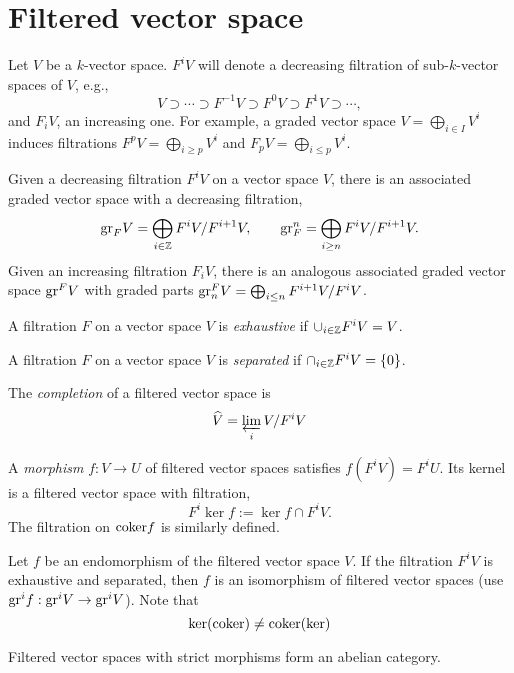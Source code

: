 \section{Filtered vector space}
Let $V$ be a $k$-vector space. $F^iV$ will denote a decreasing filtration of sub-$k$-vector spaces of $V$, e.g.,
\[
V \supset \cdots \supset F^{-1}V \supset F^0V \supset F^1V \supset \cdots,
\]
and $F_iV$, an increasing one. For example, a graded vector space $V = \bigoplus_{i \in I} V^i$ induces filtrations $F^pV = \bigoplus_{i \geq p} V^i$ and $F_p V = \bigoplus_{i \leq p} V^i$.
\begin{defn}\label{def:assocgraded}
Given a decreasing filtration $F^iV$ on a vector space $V$, there is an associated graded vector space with a decreasing filtration,
\[
\mathrm{gr}_F V = \bigoplus_{i \in \mathbb{Z}} F^i V / F^{i+1}V, \qquad \mathrm{gr}_F^n = \bigoplus_{i \geq n} F^i V / F^{i+1}V.
\]
Given an increasing filtration $F_iV$, there is an analogous associated graded vector space $\mathrm{gr}^F V$ with graded parts $\mathrm{gr}_n^F V = \bigoplus_{i \leq n} F^{i+1} V / F^i V$.
\end{defn}
\begin{defn}
A filtration $F$ on a vector space $V$ is \emph{exhaustive} if $\cup_{i \in \mathbb{Z}} F^i V = V$.
\end{defn}
\begin{defn}
A filtration $F$ on a vector space $V$ is \emph{separated} if $\cap_{i \in \mathbb{Z}} F^i V = \{0\}$.
\end{defn}
\begin{defn}
The \emph{completion} of a filtered vector space is
\[
\widehat{V} = \varprojlim_i V / F^i V
\]
\end{defn}
\begin{defn}
A \emph{morphism} $f : V \to U$ of filtered vector spaces satisfies $f(F^iV) = F^iU$. Its kernel is a filtered vector space with filtration,
\[
F^i\ker f := \ker f \cap F^iV.
\]
The filtration on $\mathrm{coker} f$ is similarly defined.
\end{defn}
\noindent Let $f$ be an endomorphism of the filtered vector space $V$. If the filtration $F^iV$ is exhaustive and separated, then $f$ is an isomorphism of filtered vector spaces (use $\mathrm{gr}^i f : \mathrm{gr}^i V \to \mathrm{gr}^i V$). Note that
\[
\ker (\mathrm{coker}) \neq \mathrm{coker}(\ker)
\]
\begin{prop}
Filtered vector spaces with strict morphisms form an abelian category.
\end{prop}

